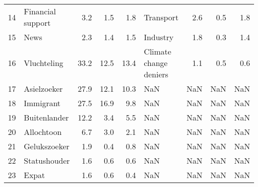 \begin{tabular}{llrrrlrrr}
14 &     Financial support &   3.2 &         1.5 &         1.8 &                  Transport &     2.6 &            0.5 &            1.8 \\
15 &                  News &   2.3 &         1.4 &         1.5 &                   Industry &     1.8 &            0.3 &            1.4 \\
16 &           Vluchteling &  33.2 &        12.5 &        13.4 &     Climate change deniers &     1.1 &            0.5 &            0.6 \\
17 &           Asielzoeker &  27.9 &        12.1 &        10.3 &                        NaN &     NaN &            NaN &            NaN \\
18 &             Immigrant &  27.5 &        16.9 &         9.8 &                        NaN &     NaN &            NaN &            NaN \\
19 &          Buitenlander &  12.2 &         3.4 &         5.5 &                        NaN &     NaN &            NaN &            NaN \\
20 &            Allochtoon &   6.7 &         3.0 &         2.1 &                        NaN &     NaN &            NaN &            NaN \\
21 &          Gelukszoeker &   1.9 &         0.4 &         0.8 &                        NaN &     NaN &            NaN &            NaN \\
22 &          Statushouder &   1.6 &         0.6 &         0.6 &                        NaN &     NaN &            NaN &            NaN \\
23 &                 Expat &   1.6 &         0.6 &         0.4 &                        NaN &     NaN &            NaN &            NaN \\
\bottomrule
\end{tabular}
